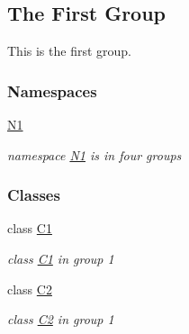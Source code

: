 \hypertarget{group__group1}{}\subsection{The First Group}
\label{group__group1}


This is the first group.  


\subsubsection*{Namespaces}
\begin{DoxyCompactItemize}
\item 
 \mbox{\hyperlink{namespace_n1}{N1}}
\begin{DoxyCompactList}\small\item\em namespace \mbox{\hyperlink{namespace_n1}{N1}} is in four groups \end{DoxyCompactList}\end{DoxyCompactItemize}
\subsubsection*{Classes}
\begin{DoxyCompactItemize}
\item 
class \mbox{\hyperlink{class_c1}{C1}}
\begin{DoxyCompactList}\small\item\em class \mbox{\hyperlink{class_c1}{C1}} in group 1 \end{DoxyCompactList}\item 
class \mbox{\hyperlink{class_c2}{C2}}
\begin{DoxyCompactList}\small\item\em class \mbox{\hyperlink{class_c2}{C2}} in group 1 \end{DoxyCompactList}\end{DoxyCompactItemize}
